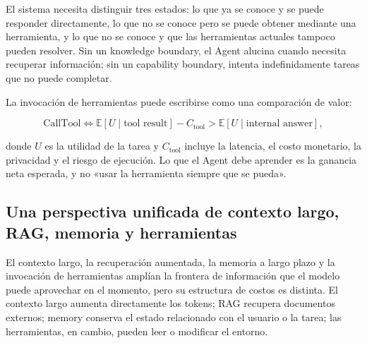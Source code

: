 El sistema necesita distinguir tres estados: lo que ya se conoce y se puede responder directamente, lo que no se conoce pero se puede obtener mediante una herramienta, y lo que no se conoce y que las herramientas actuales tampoco pueden resolver. Sin un knowledge boundary, el Agent alucina cuando necesita recuperar información; sin un capability boundary, intenta indefinidamente tareas que no puede completar.



La invocación de herramientas puede escribirse como una comparación de valor:

$$
\mathrm{CallTool}\iff
\mathbb{E}[U\mid \text{tool result}]-C_{\text{tool}}
>\mathbb{E}[U\mid \text{internal answer}],
$$

donde $U$ es la utilidad de la tarea y $C_{\text{tool}}$ incluye la latencia, el costo monetario, la privacidad y el riesgo de ejecución. Lo que el Agent debe aprender es la ganancia neta esperada, y no «usar la herramienta siempre que se pueda».

\subsection{Una perspectiva unificada de contexto largo, RAG, memoria y herramientas}

El contexto largo, la recuperación aumentada, la memoria a largo plazo y la invocación de herramientas amplían la frontera de información que el modelo puede aprovechar en el momento, pero su estructura de costos es distinta. El contexto largo aumenta directamente los tokens; RAG recupera documentos externos; memory conserva el estado relacionado con el usuario o la tarea; las herramientas, en cambio, pueden leer o modificar el entorno.



